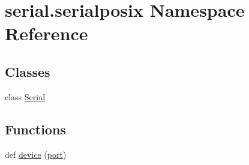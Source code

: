 \hypertarget{namespaceserial_1_1serialposix}{}\section{serial.\+serialposix Namespace Reference}
\label{namespaceserial_1_1serialposix}
\subsection*{Classes}
\begin{DoxyCompactItemize}
\item 
class \hyperlink{classserial_1_1serialposix_1_1_serial}{Serial}
\end{DoxyCompactItemize}
\subsection*{Functions}
\begin{DoxyCompactItemize}
\item 
def \hyperlink{namespaceserial_1_1serialposix_a0e42e4e4fb1a72460235aae2f97fc86d}{device} (\hyperlink{z1_2i2c_8c_a9f33b3195a1fecb0b114222456959431}{port})
\end{DoxyCompactItemize}
